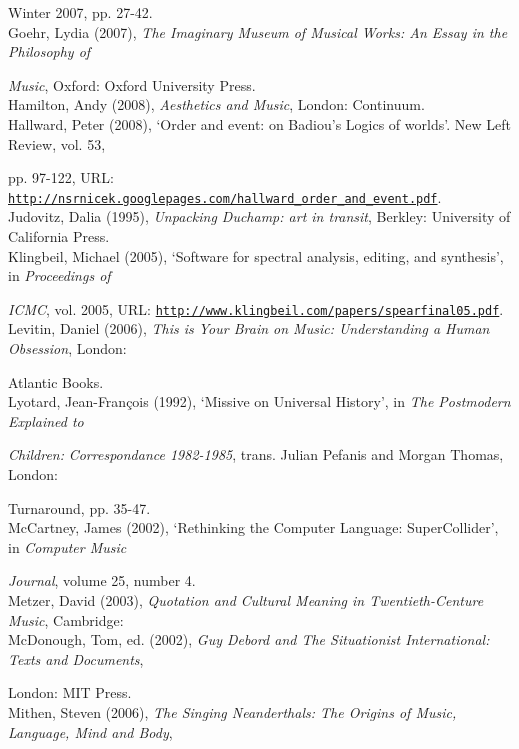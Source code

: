 Winter 2007, pp. 27-42.
\hypertarget{goer}{}\\
Goehr, Lydia (2007), \emph{The Imaginary Museum of Musical Works: An Essay in the Philosophy of}

\emph{Music}, Oxford: Oxford University Press.
\hypertarget{hamilton}{}\\
Hamilton, Andy (2008), \emph{Aesthetics and Music}, London: Continuum. 
 \hypertarget{hallward}{}\\
Hallward, Peter (2008), `Order and event: on Badiou's Logics of worlds'. New Left Review, vol. 53, 

pp. 97-122, URL: \href{http://nsrnicek.googlepages.com/hallward_order_and_event.pdf}{\texttt{http://nsrnicek.googlepages.com/hallward\_order\_and\_event.pdf}}.
\hypertarget{judovitz}{}\\
Judovitz, Dalia (1995), \emph{Unpacking Duchamp: art in transit}, Berkley: University of California Press. 
\hypertarget{klingbeil}{}\\
Klingbeil, Michael (2005), `Software for spectral analysis, editing, and synthesis', in \emph{Proceedings of}

\emph{ICMC}, vol. 2005, URL: \href{http://www.klingbeil.com/papers/spearfinal05.pdf}{\texttt{http://www.klingbeil.com/papers/spearfinal05.pdf}}.
\hypertarget{musmind}{} \\ 
Levitin, Daniel (2006), \emph{This is Your Brain on Music: Understanding a Human Obsession}, London: 

Atlantic Books. 
\hypertarget{lyotard}{}\\
Lyotard, Jean-Fran\c{c}ois (1992), `Missive on Universal History', in \emph{The Postmodern Explained to}

\emph{Children:} \emph{Correspondance 1982-1985}, trans. Julian Pefanis and Morgan Thomas, London: 

Turnaround, pp. 35-47. 
\hypertarget{mccartney}{}\\
McCartney, James (2002), `Rethinking the Computer Language: SuperCollider', in \emph{Computer Music} 

\emph{Journal}, volume 25, number 4.
\hypertarget{metzer}{}\\
Metzer, David (2003), \emph{Quotation and Cultural Meaning in Twentieth-Centure Music}, Cambridge: 
\hypertarget{mcdonough}{}\\
McDonough, Tom, ed. (2002), \emph{Guy Debord and The Situationist International: Texts and Documents}, 

London: MIT Press. 
\hypertarget{mithen}{}\\
Mithen, Steven (2006), \emph{The Singing Neanderthals: The Origins of Music, Language, Mind and Body}, 

